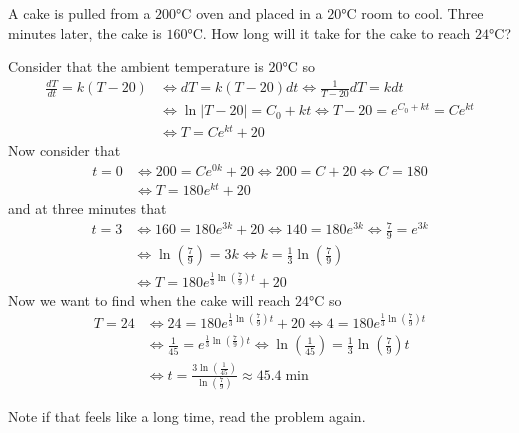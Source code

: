 \documentclass[notes.tex]{subfiles}
\begin{document}
\begin{exercise}
    A cake is pulled from a $200\si{\celsius}$ oven and  placed in a $20\si{\celsius}$ room to cool. Three minutes later, the cake is $160\si{\celsius}$. How long will it take for the cake to reach $24\si{\celsius}$?
\end{exercise}
\begin{solution}
    Consider that the ambient temperature is $20\si{\celsius}$ so
    \begin{align*}
        \frac{dT}{dt} = k(T - 20)
        &\iff dT = k(T - 20)dt
        \iff \frac{1}{T - 20}dT = kdt \\
        &\iff \ln|T - 20| = C_0 + kt
        \iff T - 20 = e^{C_0 + kt} = Ce^{kt} \\
        &\iff T = Ce^{kt} + 20
    \end{align*}
    Now consider that
    \begin{align*}
        t = 0
        &\iff 200 = Ce^{0k} + 20
        \iff 200 = C + 20
        \iff C = 180 \\
        &\iff T = 180e^{kt} + 20
    \end{align*}
    and at three minutes that
    \begin{align*}
        t = 3
        &\iff 160 = 180e^{3k} + 20
        \iff 140 = 180e^{3k}
        \iff \frac{7}{9} = e^{3k} \\
        &\iff \ln\left(\frac{7}{9}\right) = 3k
        \iff k = \frac{1}{3}\ln\left(\frac{7}{9}\right) \\
        &\iff T = 180e^{\frac{1}{3}\ln\left(\frac{7}{9}\right)t} + 20
    \end{align*}
    Now we want to find when the cake will reach $24\si{\celsius}$ so
    \begin{align*}
        T = 24
        &\iff 24 = 180e^{\frac{1}{3}\ln\left(\frac{7}{9}\right)t} + 20
        \iff 4 = 180e^{\frac{1}{3}\ln\left(\frac{7}{9}\right)t} \\
        &\iff \frac{1}{45} = e^{\frac{1}{3}\ln\left(\frac{7}{9}\right)t}
        \iff \ln\left(\frac{1}{45}\right) = \frac{1}{3}\ln\left(\frac{7}{9}\right)t \\
        &\iff t = \frac{3\ln\left(\frac{1}{45}\right)}{\ln\left(\frac{7}{9}\right)} \approx 45.4\si{\min}
    \end{align*}
\end{solution}
Note if that feels like a long time, read the problem again.
\end{document}
